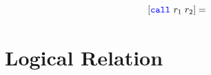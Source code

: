 \documentclass[a3paper]{article}
\newcommand{\sourcecolor}{\color{blue}}
\newcommand{\src}[1]{{\sourcecolor #1}}
\newcommand{\zinstr}[1]{\texttt{#1}}
\newcommand{\scall}[3][]{  
\ifthenelse{\equal{#2#3}{}}
  {\ensuremath{\zinstr{\src{call}}_{#1}}}
  {\ensuremath{\zinstr{\src{call}}_{#1} \; #2 \; #3}}
}
\newcommand{\comp}[1]{[#1]}
\begin{document}
\[
  \comp{\scall{r_1}{r_2}} = 
  \begin{array}[t]{l}
  \end{array}
\]

\clearpage

\section{Logical Relation}
\end{document}
